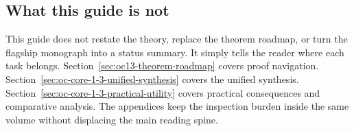 \subsection{What this guide is not}

This guide does not restate the theory, replace the theorem roadmap, or turn
the flagship monograph into a status summary. It simply tells the reader where each
task belongs. Section~\ref{sec:oc13-theorem-roadmap} covers proof navigation.
Section~\ref{sec:oc-core-1-3-unified-synthesis} covers the unified synthesis.
Section~\ref{sec:oc-core-1-3-practical-utility} covers practical consequences
and comparative analysis. The appendices keep the inspection burden inside the
same volume without displacing the main reading spine.

\clearpage

